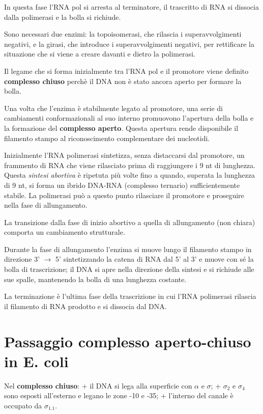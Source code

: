 \documentclass[11pt]{book}
\begin{document}
In questa fase l'RNA pol si arresta al terminatore, il trascritto di RNA
si dissocia dalla polimerasi e la bolla si richiude.

Sono necessari due enzimi: la topoisomerasi, che rilascia i
superavvolgimenti negativi, e la girasi, che introduce i
superavvolgimenti negativi, per rettificare la situazione che si viene a
creare davanti e dietro la polimerasi.

Il legame che si forma inizialmente tra l'RNA pol e il promotore viene
definito \textbf{complesso chiuso} perchè il DNA non è stato ancora
aperto per formare la bolla.

Una volta che l'enzima è stabilmente legato al promotore, una serie di
cambiamenti conformazionali al suo interno promuovono l'apertura della
bolla e la formazione del \textbf{complesso aperto}. Questa apertura
rende disponibile il filamento stampo al riconoscimento complementare
dei nucleotidi.

Inizialmente l'RNA polimerasi sintetizza, senza distaccarsi dal
promotore, un frammento di RNA che viene rilasciato prima di raggiungere
i 9 nt di lunghezza. Questa \emph{sintesi abortiva} è ripetuta più volte
fino a quando, superata la lunghezza di 9 nt, si forma un ibrido DNA-RNA
(complesso ternario) sufficientemente stabile. La polimerasi può a
questo punto rilasciare il promotore e proseguire nella fase di
allungamento.

La transizione dalla fase di inizio abortivo a quella di allungamento
(non chiara) comporta un cambiamento strutturale.

Durante la fase di allungamento l'enzima si muove lungo il filamento
stampo in direzione 3' \(\rightarrow\) 5' sintetizzando la catena di RNA
dal 5' al 3' e muove con sé la bolla di trascrizione; il DNA si apre
nella direzione della sintesi e si richiude alle sue spalle, mantenendo
la bolla di una lunghezza costante.

La terminazione è l'ultima fase della trascrizione in cui l'RNA
polimerasi rilascia il filamento di RNA prodotto e si dissocia dal DNA.

\section{Passaggio complesso aperto-chiuso in E.
coli}\label{passaggio-complesso-aperto-chiuso-in-e.-coli}

Nel \textbf{complesso chiuso}: + il DNA si lega alla superficie con
\(\alpha\) e \(\sigma\); + \(\sigma\)\(_2\) e \(\sigma\)\(_4\) sono
esposti all'esterno e legano le zone -10 e -35; + l'interno del canale è
occupato da \(\sigma\)\(_1.1\).
\end{document}
